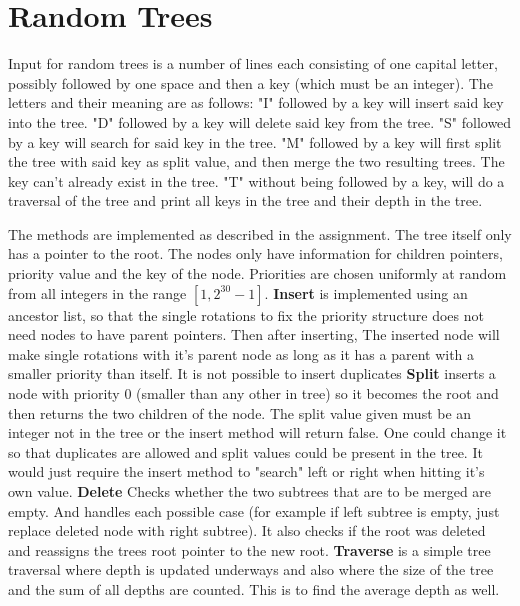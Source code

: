 \documentclass[12pt, a4paper]{article}
\begin{document}
\section*{Random Trees}
Input for random trees is a number of lines each consisting of one capital 
letter, possibly followed by one space and then a key (which must be an integer).
The letters and their meaning are as follows: 
"I" followed by a key will insert said key into the tree.
"D" followed by a key will delete said key from the tree.
"S" followed by a key will search for said key in the tree.
"M" followed by a key will first split the tree with said key as split value,
and then merge the two resulting trees. The key can't already exist in the tree.
"T" without being followed by a key, will do a traversal of the tree and print all keys in the tree and their depth in the tree.

\medskip

\medskip
The methods are implemented as described in the assignment. 
The tree itself only has a pointer to the root.
The nodes only have information for children pointers, priority value and the key of the node.
Priorities are chosen uniformly at random from all integers in the range
$[1,2^30-1]$. 
\textbf{Insert} is implemented using an ancestor list, so that the single
rotations to fix the priority structure does not need nodes to have parent pointers.
Then after inserting, The inserted node will make single rotations with
it's parent node as long as it has a parent with a smaller priority than itself.
It is not possible to insert duplicates
\textbf{Split} inserts a node with priority 0 (smaller than any other in tree)
so it becomes the root and then returns the two children of the node.
The split value given must be an integer not in the tree or the insert method will return false.
One could change it so that duplicates are allowed and split values could 
be present in the tree. It would just require the insert method to "search" left or right when hitting it's own value.
\textbf{Delete} Checks whether the two subtrees that are to be merged are empty. And handles each possible case (for example if left subtree is empty, just 
replace deleted node with right subtree). 
It also checks if the root was deleted and reassigns the trees root pointer to
the new root.
\textbf{Traverse} is a simple tree traversal where depth is updated underways
and also where the size of the tree and the sum of all depths are counted. 
This is to find the average depth as well. 


\medskip
\end{document}
